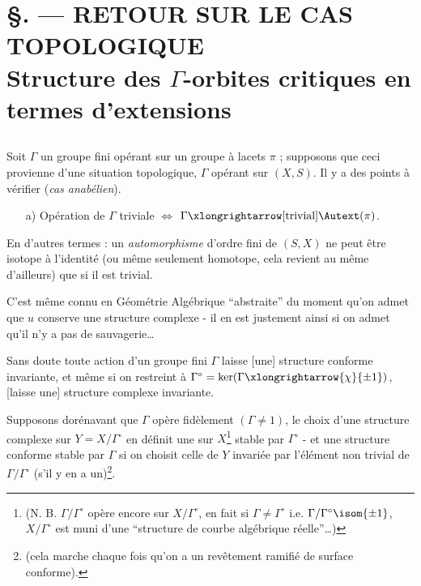 \chapter*{\S {}. --- RETOUR SUR LE CAS TOPOLOGIQUE \\ Structure des $\Gamma$-orbites critiques en termes d'extensions}\thispagestyle{empty}
\label{sec:15}
\section*{}

Soit $\Gamma$ un groupe fini opérant sur un groupe à lacets $\pi$ ; supposons que ceci provienne d'une situation topologique, $\Gamma$ opérant sur $(X, S)$. Il y a des points à vérifier (\emph{cas anabélien}).
\begin{enumerate}
    \item[a)] Opération de $\Gamma$ triviale $\Longleftrightarrow$ $\Gamma \xlongrightarrow[\text{trivial}]{} \Autext (\pi)$. 
\end{enumerate}
En d'autres termes : un \emph{automorphisme} d'ordre fini de $(S, X)$ ne peut être isotope à l'identité (ou même seulement homotope, cela revient au même d'ailleurs) que si il est trivial.

C'est même connu en Géométrie Algébrique ``abstraite'' du moment qu'on admet que $u$ conserve une structure complexe - il en est justement ainsi si on admet qu'il n'y a pas de sauvagerie\dots

Sans doute toute action d'un groupe fini $\Gamma$ laisse [une] structure conforme invariante, et même si on restreint à $\Gamma^\circ = \ker (\Gamma \xlongrightarrow{\chi} \{ \pm 1 \})$, [laisse une] structure complexe invariante.

Supposons dorénavant que $\Gamma$ opère fidèlement $(\Gamma \neq 1)$, le choix d'une structure complexe sur $Y = X / \Gamma^\circ$ en définit une sur $X$\footnote{(N. B. $\Gamma / \Gamma^\circ$ opère encore sur $X / \Gamma^\circ$, en fait si $\Gamma \neq \Gamma^\circ$ i.e. $\Gamma / \Gamma^\circ \isom \{ \pm 1 \}$, $X / \Gamma^\circ$ est muni d'une ``structure de courbe algébrique réelle''\dots)} stable par $\Gamma^\circ$ - et une structure conforme stable par $\Gamma$ si on choisit celle de $Y$ invariée par l'élément non trivial de $\Gamma / \Gamma^\circ$ (s'il y en a un)\footnote{(cela marche chaque fois qu'on a un revêtement ramifié de surface conforme).}.

